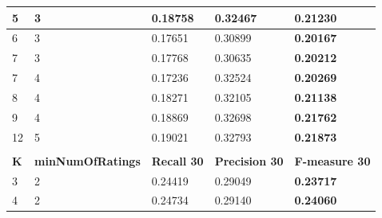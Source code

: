 \documentclass[12pt]{report}
\begin{document}
\begin{table}[htpb]
\begin{tabular}{lllll}
\multicolumn{1}{|l|}{5}       & \multicolumn{1}{l|}{3}                        & \multicolumn{1}{l|}{0.18758}         & \multicolumn{1}{l|}{0.32467}            & \multicolumn{1}{l|}{{\bf 0.21230}}      \\ \hline
\multicolumn{1}{|l|}{6}       & \multicolumn{1}{l|}{3}                        & \multicolumn{1}{l|}{0.17651}         & \multicolumn{1}{l|}{0.30899}            & \multicolumn{1}{l|}{{\bf 0.20167}}      \\ \hline
\multicolumn{1}{|l|}{7}       & \multicolumn{1}{l|}{3}                        & \multicolumn{1}{l|}{0.17768}         & \multicolumn{1}{l|}{0.30635}            & \multicolumn{1}{l|}{{\bf 0.20212}}      \\ \hline
\multicolumn{1}{|l|}{7}       & \multicolumn{1}{l|}{4}                        & \multicolumn{1}{l|}{0.17236}         & \multicolumn{1}{l|}{0.32524}            & \multicolumn{1}{l|}{{\bf 0.20269}}      \\ \hline
\multicolumn{1}{|l|}{8}       & \multicolumn{1}{l|}{4}                        & \multicolumn{1}{l|}{0.18271}         & \multicolumn{1}{l|}{0.32105}            & \multicolumn{1}{l|}{{\bf 0.21138}}      \\ \hline
\multicolumn{1}{|l|}{9}       & \multicolumn{1}{l|}{4}                        & \multicolumn{1}{l|}{0.18869}         & \multicolumn{1}{l|}{0.32698}            & \multicolumn{1}{l|}{{\bf 0.21762}}      \\ \hline
\multicolumn{1}{|l|}{12}      & \multicolumn{1}{l|}{5}                        & \multicolumn{1}{l|}{0.19021}         & \multicolumn{1}{l|}{0.32793}            & \multicolumn{1}{l|}{{\bf 0.21873}}      \\ \hline
                              &                                               &                                      &                                         &                                         \\ \hline
\multicolumn{1}{|l|}{{\bf K}} & \multicolumn{1}{l|}{{\bf minNumOfRatings}} & \multicolumn{1}{l|}{{\bf Recall 30}} & \multicolumn{1}{l|}{{\bf Precision 30}} & \multicolumn{1}{l|}{{\bf F-measure 30}} \\ \hline
\multicolumn{1}{|l|}{3}       & \multicolumn{1}{l|}{2}                        & \multicolumn{1}{l|}{0.24419}         & \multicolumn{1}{l|}{0.29049}            & \multicolumn{1}{l|}{{\bf 0.23717}}      \\ \hline
\multicolumn{1}{|l|}{4}       & \multicolumn{1}{l|}{2}                        & \multicolumn{1}{l|}{0.24734}         & \multicolumn{1}{l|}{0.29140}            & \multicolumn{1}{l|}{{\bf 0.24060}}      \\ \hline

\end{tabular}
\end{table}
\end{document}
